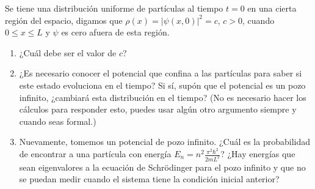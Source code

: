 \documentclass[10pt,letterpaper]{article}
\newenvironment{modenumerate}
  {\enumerate\setupmodenumerate}
  {\endenumerate}
\newif\ifmoditem
\newcommand{\setupmodenumerate}{%
  \global\moditemfalse
  \let\origmakelabel\makelabel
  \def\moditem##1{\global\moditemtrue\def\mesymbol{##1}\item}%
  \def\makelabel##1{%
    \origmakelabel{##1\ifmoditem\rlap{\mesymbol}\fi\enspace}%
    \global\moditemfalse}%
}
\begin{document}
\begin{modenumerate}
\moditem{} Se tiene una distribución uniforme de partículas al tiempo $t=0$ en una cierta región del espacio, digamos que $\rho(x)=|\psi(x,0)|^2=c$, $c > 0$, cuando $0\leq x \leq L$ y $\psi$ es cero afuera de esta región.
\begin{enumerate}
\renewcommand{\theenumi}{\Alph{enumi}}
\item ¿Cuál debe ser el valor de $c$?
\item ¿Es necesario conocer el potencial que confina a las partículas para saber si este estado evoluciona en el tiempo? Si sí, supón que el potencial es un pozo infinito, ¿cambiará esta distribución en el tiempo? (No es necesario hacer los cálculos para responder esto, puedes usar algún otro argumento siempre y cuando seas formal.)
\item Nuevamente, tomemos un potencial de pozo infinito. ¿Cuál es la probabilidad de encontrar a una partícula con energía $E_n={n}^2\frac{\pi^2\hbar^2}{2mL^2}$? ¿Hay energías que sean eigenvalores a la ecuación de Schrödinger para el pozo infinito y que no se puedan medir cuando el sistema tiene la condición inicial anterior?
\end{enumerate}

\end{modenumerate}
\end{document}
